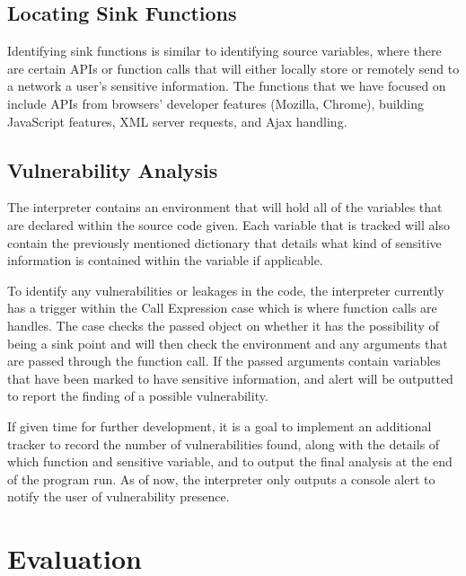 \documentclass[jou,apacite]{apa6}
\begin{document}
	\subsection{Locating Sink Functions}

		Identifying sink functions is similar to identifying source variables, where there are certain APIs or function calls that will either locally store or remotely send to a network a user’s sensitive information. The functions that we have focused on include APIs from browsers’ developer features (Mozilla, Chrome), building JavaScript features, XML server requests, and Ajax handling.

	\subsection{Vulnerability Analysis}

		The interpreter contains an environment that will hold all of the variables that are declared within the source code given. Each variable that is tracked will also contain the previously mentioned dictionary that details what kind of sensitive information is contained within the variable if applicable.

		To identify any vulnerabilities or leakages in the code, the interpreter currently has a trigger within the Call Expression case which is where function calls are handles. The case checks the passed object on whether it has the possibility of being a sink point and will then check the environment and any arguments that are passed through the function call. If the passed arguments contain variables that have been marked to have sensitive information, and alert will be outputted to report the finding of a possible vulnerability.

		If given time for further development, it is a goal to implement an additional tracker to record the number of vulnerabilities found, along with the details of which function and sensitive variable, and to output the final analysis at the end of the program run. As of now, the interpreter only outputs a console alert to notify the user of vulnerability presence.



\section{Evaluation}
\end{document}
